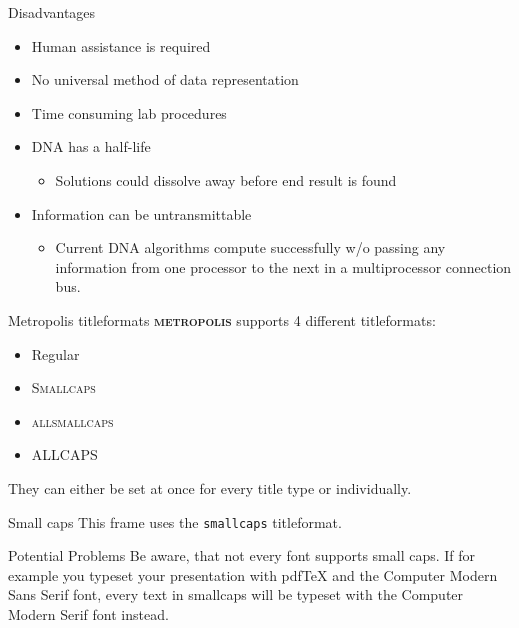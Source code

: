 \documentclass[10pt]{beamer}
\newcommand{\themename}{\textbf{\textsc{metropolis}}\xspace}
\begin{document}
\begin{frame}{Disadvantages}
  \begin{itemize}
    \item {Human assistance is required}
    \item {No universal method of data representation}
    \item {Time consuming lab procedures}
        \item {DNA has a half-life
          \begin{itemize}
        \item{Solutions could dissolve away before end result is found}
      \end{itemize}
            }
        \item {Information can be untransmittable
          \begin{itemize}
        \item{Current DNA algorithms compute successfully w/o passing any information from one processor to the next in a multiprocessor connection bus.}
      \end{itemize}
            }
  \end{itemize}
\end{frame}

\begin{frame}{Metropolis titleformats}
  \themename supports 4 different titleformats:
  \begin{itemize}
    \item Regular
    \item \textsc{Smallcaps}
    \item \textsc{allsmallcaps}
    \item ALLCAPS
  \end{itemize}
  They can either be set at once for every title type or individually.
\end{frame}

{
\begin{frame}{Small caps}
  This frame uses the \texttt{smallcaps} titleformat.

  \begin{alertblock}{Potential Problems}
    Be aware, that not every font supports small caps. If for example you typeset your presentation with pdfTeX and the Computer Modern Sans Serif font, every text in smallcaps will be typeset with the Computer Modern Serif font instead.
  \end{alertblock}
\end{frame}
}
\end{document}
